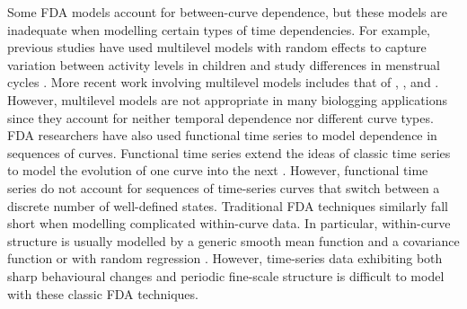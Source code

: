 Some FDA models account for between-curve dependence, but these models are inadequate when modelling certain types of time dependencies. %
For example, 
previous studies have used multilevel models with random effects to capture variation between activity levels in children \citep{Morris:2007} and study differences in menstrual cycles \citep{Bromback:1998}. More recent work involving multilevel models includes that of \citet{Di:2009}, \citet{Chen:2012}, and \citet{Crainiceanu:2009}. However, multilevel models are not appropriate in many biologging applications since they account for neither temporal dependence nor different curve types. 
FDA researchers have also used functional time series to model dependence in sequences of curves. Functional time series extend the ideas of classic time series to model the evolution of one curve into the next \citep{Kokoszka:2018}. %
However, functional time series do not account for sequences of time-series curves that switch between a discrete number of well-defined states.
%
Traditional FDA techniques similarly fall short when modelling complicated within-curve %
data. In particular, within-curve structure is usually modelled by a generic smooth mean function and a covariance function \citep{Yao:2005} 
or with random regression \citep{Rice:2001}. 
However, time-series data exhibiting both sharp behavioural changes and periodic fine-scale structure is difficult to model with these classic FDA techniques.

